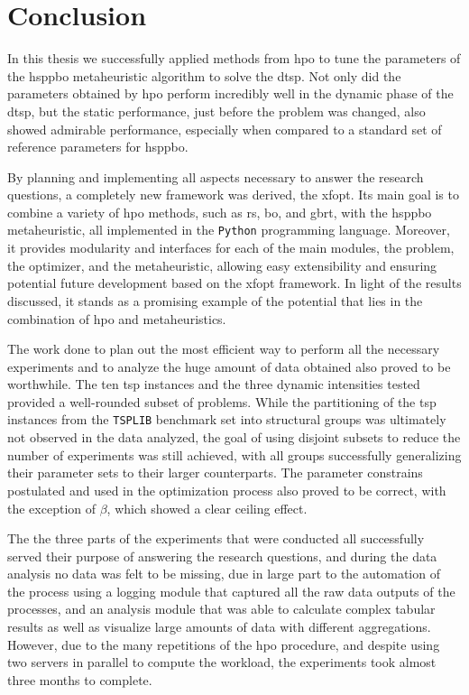 

\chapter{Conclusion}
\label{chap:conclusion}

\glsresetall

In this thesis we successfully applied methods from \gls{hpo} to tune the parameters of the \gls{hsppbo} metaheuristic algorithm to solve the \gls{dtsp}. 
Not only did the parameters obtained by \gls{hpo} perform incredibly well in the dynamic phase of the \gls{dtsp}, but the static performance, just before the problem was changed, also showed admirable performance, especially when compared to a standard set of reference parameters for \gls{hsppbo}.

By planning and implementing all aspects necessary to answer the research questions, a completely new framework was derived, the \gls{xfopt}. Its main goal is to combine a variety of \gls{hpo} methods, such as \gls{rs}, \gls{bo}, and \gls{gbrt}, with the \gls{hsppbo} metaheuristic, all implemented in the \texttt{Python} programming language. Moreover, it provides modularity and interfaces for each of the main modules, the problem, the optimizer, and the metaheuristic, allowing easy extensibility and ensuring potential future development based on the \gls{xfopt} framework. 
In light of the results discussed, it stands as a promising example of the potential that lies in the combination of \gls{hpo} and metaheuristics.

The work done to plan out the most efficient way to perform all the necessary experiments and to analyze the huge amount of data obtained also proved to be worthwhile. The ten \gls{tsp} instances and the three dynamic intensities tested provided a well-rounded subset of problems. While the partitioning of the \gls{tsp} instances from the  \texttt{TSPLIB} benchmark set into structural groups was ultimately not observed in the data analyzed, the goal of using disjoint subsets to reduce the number of experiments was still achieved, with all groups successfully generalizing their parameter sets to their larger counterparts. The parameter constrains postulated and used in the optimization process also proved to be correct, with the exception of $\beta$, which showed a clear ceiling effect. 

The the three parts of the experiments that were conducted all successfully served their purpose of answering the research questions, and during the data analysis no data was felt to be missing, due in large part to the automation of the process using a logging module that captured all the raw data outputs of the processes, and an analysis module that was able to calculate complex tabular results as well as visualize large amounts of data with different aggregations. However, due to the many repetitions of the \gls{hpo} procedure, and despite using two servers in parallel to compute the workload, the experiments took almost three months to complete.

